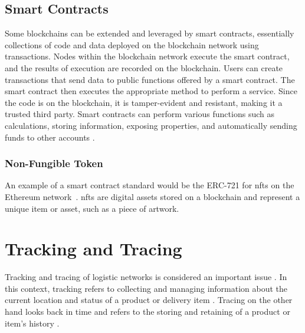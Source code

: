 \subsection{Smart Contracts}
Some blockchains can be extended and leveraged by smart contracts, essentially collections of code and data deployed on the blockchain network using transactions. Nodes within the blockchain network execute the smart contract, and the results of execution are recorded on the blockchain. Users can create transactions that send data to public functions offered by a smart contract. The smart contract then executes the appropriate method to perform a service. Since the code is on the blockchain, it is tamper-evident and resistant, making it a trusted third party. Smart contracts can perform various functions such as calculations, storing information, exposing properties, and automatically sending funds to other accounts \parencite{blockchainoverview}.

\subsubsection{Non-Fungible Token}
An example of a smart contract standard would be the ERC-721 for \glspl{nft} on the Ethereum network~\cite{erc721}. \glspl{nft} are digital assets stored on a blockchain and represent a unique item or asset, such as a piece of artwork. 

\section{Tracking and Tracing}
Tracking and tracing of logistic networks is considered an important issue \cite{trackingtracing}. In this context, tracking refers to collecting and managing information about the current location and status of a product or delivery item \cite{trackingtracing}. Tracing on the other hand looks back in time and refers to the storing and retaining of a product or item's history \cite{practicetrackingtracing}.
